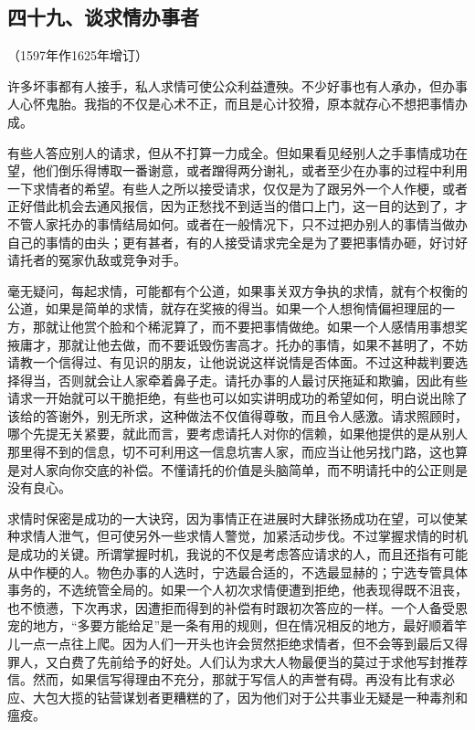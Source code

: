 \subsection*{四十九、谈求情办事者}
\begin{center}
    （1597年作1625年增订）
\end{center}
\par 许多坏事都有人接手，私人求情可使公众利益遭殃。不少好事也有人承办，但办事人心怀鬼胎。我指的不仅是心术不正，而且是心计狡猾，原本就存心不想把事情办成。
\par 有些人答应别人的请求，但从不打算一力成全。但如果看见经别人之手事情成功在望，他们倒乐得博取一番谢意，或者蹭得两分谢礼，或者至少在办事的过程中利用一下求情者的希望。有些人之所以接受请求，仅仅是为了跟另外一个人作梗，或者正好借此机会去通风报信，因为正愁找不到适当的借口上门，这一目的达到了，才不管人家托办的事情结局如何。或者在一般情况下，只不过把办别人的事情当做办自己的事情的由头；更有甚者，有的人接受请求完全是为了要把事情办砸，好讨好请托者的冤家仇敌或竞争对手。
\par 毫无疑问，每起求情，可能都有个公道，如果事关双方争执的求情，就有个权衡的公道，如果是简单的求情，就存在奖掖的得当。如果一个人想徇情偏袒理屈的一方，那就让他赏个脸和个稀泥算了，而不要把事情做绝。如果一个人感情用事想奖掖庸才，那就让他去做，而不要诋毁伤害高才。托办的事情，如果不甚明了，不妨请教一个信得过、有见识的朋友，让他说说这样说情是否体面。不过这种裁判要选择得当，否则就会让人家牵着鼻子走。请托办事的人最讨厌拖延和欺骗，因此有些请求一开始就可以干脆拒绝，有些也可以如实讲明成功的希望如何，明白说出除了该给的答谢外，别无所求，这种做法不仅值得尊敬，而且令人感激。请求照顾时，哪个先提无关紧要，就此而言，要考虑请托人对你的信赖，如果他提供的是从别人那里得不到的信息，切不可利用这一信息坑害人家，而应当让他另找门路，这也算是对人家向你交底的补偿。不懂请托的价值是头脑简单，而不明请托中的公正则是没有良心。
\par 求情时保密是成功的一大诀窍，因为事情正在进展时大肆张扬成功在望，可以使某种求情人泄气，但可使另外一些求情人警觉，加紧活动步伐。不过掌握求情的时机是成功的关键。所谓掌握时机，我说的不仅是考虑答应请求的人，而且还指有可能从中作梗的人。物色办事的人选时，宁选最合适的，不选最显赫的；宁选专管具体事务的，不选统管全局的。如果一个人初次求情便遭到拒绝，他表现得既不沮丧，也不愤懑，下次再求，因遭拒而得到的补偿有时跟初次答应的一样。一个人备受恩宠的地方，“多要方能给足”是一条有用的规则，但在情况相反的地方，最好顺着竿儿一点一点往上爬。因为人们一开头也许会贸然拒绝求情者，但不会等到最后又得罪人，又白费了先前给予的好处。人们认为求大人物最便当的莫过于求他写封推荐信。然而，如果信写得理由不充分，那就于写信人的声誉有碍。再没有比有求必应、大包大揽的钻营谋划者更糟糕的了，因为他们对于公共事业无疑是一种毒剂和瘟疫。




